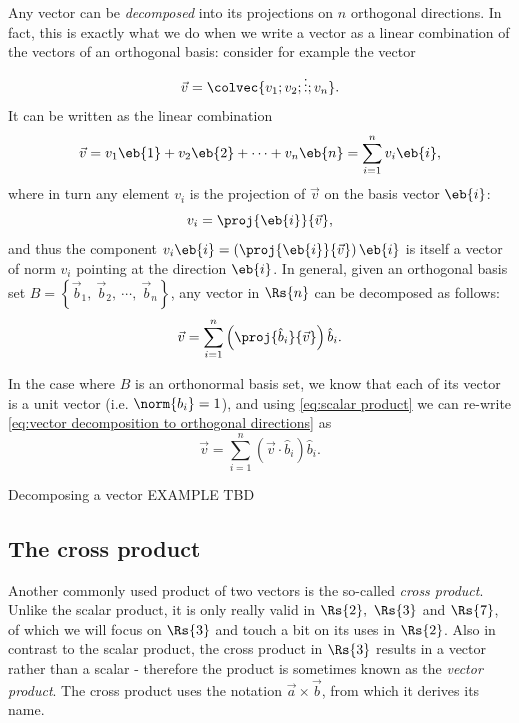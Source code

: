 Any vector can be \emph{decomposed} into its projections on $n$ orthogonal directions. In fact, this is exactly what we do when we write a vector as a linear combination of the vectors of an orthogonal basis: consider for example the vector
\[
	\vec{v} = \colvec{v_{1};v_{2};\vdots;v_{n}}.
\]
It can be written as the linear combination
\[
	\vec{v} = v_{1}\eb{1} + v_{2}\eb{2} + \cdots + v_{n}\eb{n} = \sum\limits_{i=1}^{n}v_{i}\eb{i},
\]
where in turn any element $v_{i}$ is the projection of $\vec{v}$ on the basis vector $\eb{i}$:
\begin{equation}
	v_{i} = \proj{\eb{i}}{\vec{v}},
	\label{eq:}
\end{equation}
and thus the component $v_{i}\eb{i}=\left(\proj{\eb{i}}{\vec{v}}\right)\eb{i}$ is itself a vector of norm $v_{i}$ pointing at the direction $\eb{i}$. In general, given an orthogonal basis set $B=\left\{ \vec{b}_{1},\ \vec{b}_{2},\ \cdots,\ \vec{b}_{n} \right\}$, any vector in $\Rs{n}$ can be decomposed as follows:
\begin{equation}
	\vec{v} = \sum\limits_{i=1}^{n}\left(\proj{\hat{b}_{i}}{\vec{v}}\right)\hat{b}_{i}.
	\label{eq:vector decomposition to orthogonal directions}
\end{equation}

In the case where $B$ is an orthonormal basis set, we know that each of its vector is a unit vector (i.e. $\norm{b_{i}}=1$), and using \autoref{eq:scalar product} we can re-write \autoref{eq:vector decomposition to orthogonal directions} as
\begin{equation}
	\vec{v} = \sum\limits_{i=1}^{n}\left( \vec{v}\cdot\hat{b}_{i} \right)\hat{b}_{i}.
	\label{eq:vector decomposition in orthonormal basis set}
\end{equation}

\begin{example}{Decomposing a vector}{}
	EXAMPLE TBD
\end{example}


\subsection{The cross product}
Another commonly used product of two vectors is the so-called \emph{cross product}. Unlike the scalar product, it is only really valid in $\Rs{2},\ \Rs{3}$ and $\Rs{7}$, of which we will focus on $\Rs{3}$ and touch a bit on its uses in $\Rs{2}$. Also in contrast to the scalar product, the cross product in $\Rs{3}$ results in a vector rather than a scalar - therefore the product is sometimes known as the \emph{vector product}. The cross product uses the notation $\vec{a}\times\vec{b}$, from which it derives its name.

